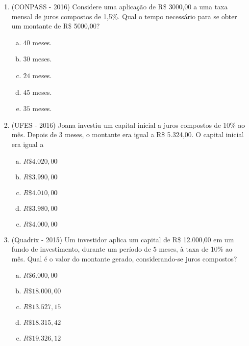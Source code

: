 \begin{enumerate}
  \item (CONPASS - 2016) Considere uma aplicação de R\$ 3000,00 a uma taxa mensal de juros compostos de 1,5\%. Qual o tempo necessário para se obter um montante de R\$ 5000,00?
  \begin{enumerate}[a)]
  \item $40$ meses.
  \item $30$ meses.
  \item $24$ meses.
  \item $45$ meses.
  \item $35$ meses.
  \end{enumerate}
  
  \item (UFES - 2016) Joana investiu um capital inicial a juros compostos de 10\% ao mês. Depois de 3 meses, o montante era igual a R\$ 5.324,00. O capital inicial era igual a  
  \begin{enumerate}[a)]
  \item $R\$ 4.020,00$
  \item $R\$ 3.990,00$
  \item $R\$ 4.010,00$
  \item $R\$ 3.980,00$
  \item $R\$ 4.000,00$
  \end{enumerate}
  
  \item (Quadrix - 2015) Um investidor aplica um capital de R\$ 12.000,00 em um fundo de investimento, durante um período de 5 meses, à taxa de 10\% ao mês. Qual é o valor do montante gerado, considerando-se juros compostos?
  \begin{enumerate}[a)]
  \item $R\$ 6.000,00$
  \item $R\$ 18.000,00$
  \item $R\$ 13.527,15$
  \item $R\$ 18.315,42$
  \item $R\$ 19.326,12$
  \end{enumerate}
  
 \end{enumerate}
  

 

  
  
